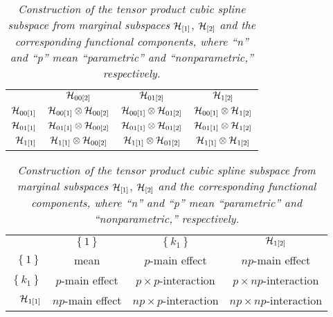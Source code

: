 \begin{table}[H]
\begin{center}%
\begin{tabular}{r|c|c|c|} %
\multicolumn{1}{c}{} & \multicolumn{1}{c}{	$\mathcal{H}_{00\left[2\right]}$}	&	\multicolumn{1}{c}{$\mathcal{H}_{01\left[2\right]} $}	&\multicolumn{1}{c}{ $\mathcal{H}_{1\left[2\right]}$}\\ [1.5ex] 
\cline{2-4}  %
$\mathcal{H}_{00\left[1\right]} $		& $\mathcal{H}_{00\left[1\right]}\otimes \mathcal{H}_{00\left[2\right]}$ 	&	$\mathcal{H}_{00\left[1\right]}	\otimes \mathcal{H}_{01\left[2\right]} $	&	$\mathcal{H}_{00\left[1\right]}	\otimes \mathcal{H}_{1\left[2\right]}$   \\ [1.5ex] 
$\mathcal{H}_{01\left[1\right]}$		& $\mathcal{H}_{01\left[1\right]} \otimes \mathcal{H}_{00\left[2\right]}$			& 	$\mathcal{H}_{01\left[1\right]} \otimes \mathcal{H}_{01\left[2\right]}$   &   $\mathcal{H}_{01\left[1\right]} \otimes \mathcal{H}_{1\left[2\right]}$\\ [1.5ex] 
 $\mathcal{H}_{1\left[1\right]}$	& 	 $\mathcal{H}_{1\left[1\right]} \otimes \mathcal{H}_{00\left[2\right]}$	&	$\mathcal{H}_{1\left[1\right]} \otimes \mathcal{H}_{01\left[2\right]}$ 	&	$\mathcal{H}_{1\left[1\right]} \otimes \mathcal{H}_{1\left[2\right]}$ \\ [1.5ex] 
\cline{2-4}
\end{tabular}
\end{center}
\hfill
\hfill
\begin{center}
\begin{tabular}{r|c|c|c|} %
\multicolumn{1}{c}{} & \multicolumn{1}{c}{	$\left\{1\right\}$}	&	\multicolumn{1}{c}{$ \left\{k_1\right\}$}	&\multicolumn{1}{c}{ $\mathcal{H}_{1\left[2\right]}$}\\ [1.5ex] 
\cline{2-4}  %
$ \left\{1\right\}$		& mean	&	$p$-main effect	&	$np$-main effect  \\ [1.5ex] 
$ \left\{k_1\right\}$	& 	$p$-main effect	& 	$p\times p$-interaction   & $p \times np$-interaction  \\ [1.5ex] 
 $\mathcal{H}_{1\left[1\right]}$	& 	$np$-main effect 	&  $np\times p$-interaction	&	$np \times np$-interaction \\ [1.5ex] 
\cline{2-4}
\end{tabular}
\end{center}
\caption{\textit{Construction of the tensor product cubic spline subspace from marginal subspaces} $\mathcal{H}_{\left[1\right]}$, $\mathcal{H}_{\left[2\right]}$ \textit{and the corresponding functional components, where ``n'' and ``p'' mean ``parametric'' and ``nonparametric,'' respectively.}} %
\label{table:tensor-product-cubic-spline-RKHS-table}
\end{table}



